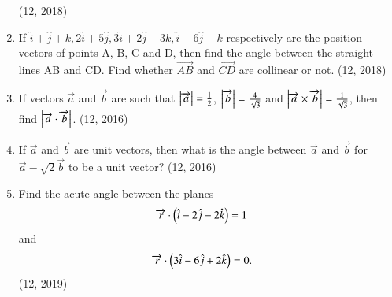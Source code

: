 \begin{enumerate}[label=\thesubsection.\arabic*, ref=\thesubsection.\theenumi]
\hfill (12, 2018)
\item If $\hat{i}+\hat{j}+{k} ,  2\hat{i}+5\hat{j} ,  3\hat{i}+2\hat{j}-3{k} ,  \hat{i}-6\hat{j}-{k}$ respectively are the position vectors of points A, B, C and D, then find the angle between the straight lines AB and CD. Find whether $\overrightarrow{AB}$ and $\overrightarrow{CD}$ are collinear or not. 
\hfill (12, 2018) 
\item If vectors $\overrightarrow{a}$ and $\overrightarrow{b}$ are such that
      $\left\vert\overrightarrow{a}\right\vert = \frac{1}{2}$, $\left\vert\overrightarrow{b}\right\vert = \frac{4}{\sqrt{3}}$
      and $\left\vert\overrightarrow{a} \times \overrightarrow{b}\right\vert = \frac{1}{\sqrt{3}}$, then find
      $\left\vert\overrightarrow{a}\cdot \overrightarrow{b} \right\vert$. \hfill (12, 2016)
\item If $\overrightarrow{a}$ and $\overrightarrow{b}$ are unit vectors, then what is the angle between
      $\overrightarrow{a}$ and $\overrightarrow{b}$ for $\overrightarrow{a} - \sqrt{2}\overrightarrow{b}$ to be a unit vector? \hfill (12, 2016)
\item Find the acute angle between the planes
    \begin{align*}
        \overrightarrow{r} \cdot \left(\hat{i}-2\hat{j}-2\hat{k}\right) &= 1
    \end{align*}
    and
    \begin{align*}
        \overrightarrow{r} \cdot \left(3\hat{i}-6\hat{j}+2\hat{k}\right) &= 0.
    \end{align*}
    \hfill (12, 2019)


\end{enumerate}
